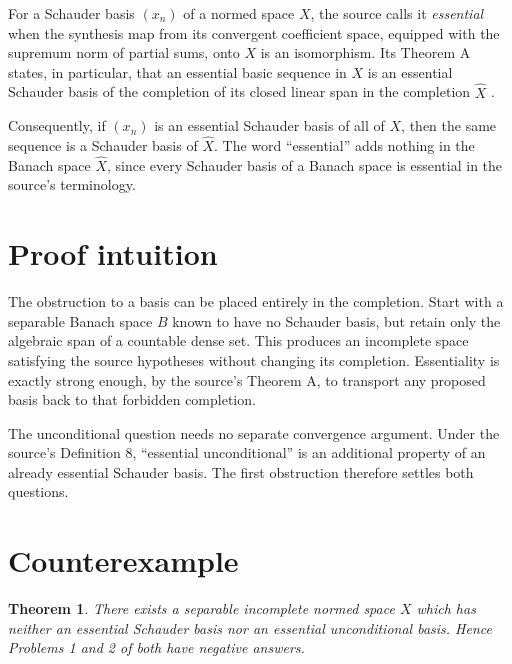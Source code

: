 \documentclass[11pt]{article}
\newtheorem{theorem}{Theorem}
\begin{document}
For a Schauder basis $(x_n)$ of a normed space $X$, the source calls it
\emph{essential} when the synthesis map from its convergent coefficient
space, equipped with the supremum norm of partial sums, onto $X$ is an
isomorphism. Its Theorem A states, in particular, that an essential basic
sequence in $X$ is an essential Schauder basis of the completion of its closed
linear span in the completion $\widehat X$ \cite{source}.

Consequently, if $(x_n)$ is an essential Schauder basis of all of $X$, then
the same sequence is a Schauder basis of $\widehat X$. The word
``essential'' adds nothing in the Banach space $\widehat X$, since every
Schauder basis of a Banach space is essential in the source's terminology.

\section{Proof intuition}

The obstruction to a basis can be placed entirely in the completion. Start
with a separable Banach space $B$ known to have no Schauder basis, but retain
only the algebraic span of a countable dense set. This produces an incomplete
space satisfying the source hypotheses without changing its completion.
Essentiality is exactly strong enough, by the source's Theorem A, to transport
any proposed basis back to that forbidden completion.

The unconditional question needs no separate convergence argument. Under the
source's Definition 8, ``essential unconditional'' is an additional property
of an already essential Schauder basis. The first obstruction therefore
settles both questions.

\section{Counterexample}

\begin{theorem}\label{thm:counterexample}
There exists a separable incomplete normed space $X$ which has neither an
essential Schauder basis nor an essential unconditional basis. Hence Problems
1 and 2 of \cite{source} both have negative answers.
\end{theorem}
\end{document}

